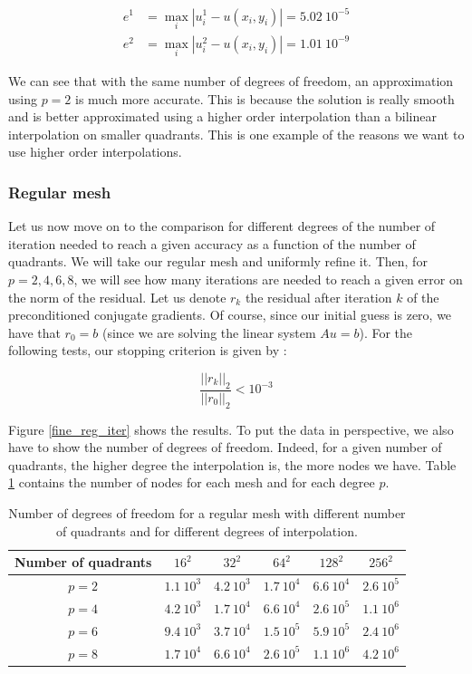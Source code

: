 \begin{align*}
e^1 &= \max_i |u^1_i - u(x_i,y_i)| = 5.02\: 10^{-5}\\
e^2 & = \max_i |u^2_i - u(x_i,y_i)| = 1.01 \: 10^{-9}
\end{align*}

We can see that with the same number of degrees of freedom, an approximation using $p=2$ is much more accurate. This is because the solution is really smooth and is better approximated using a higher order interpolation than a bilinear interpolation on smaller quadrants. This is one example of the reasons we want to use higher order interpolations. 

\subsubsection{Regular mesh}

Let us now move on to the comparison for different degrees of the number of iteration needed to reach a given accuracy as a function of the number of quadrants. We will take our regular mesh and uniformly refine it. Then, for $p=2,4,6,8$, we will see how many iterations are needed to reach a given error on the norm of the residual. Let us denote $r_k$ the residual after iteration $k$ of the preconditioned conjugate gradients. Of course, since our initial guess is zero, we have that $r_0 = b$ (since we are solving the linear system $Au = b$). For the following tests, our stopping criterion is given by :

$$ \frac{||r_k||_2}{||r_0||_2} < 10^{-3}$$

Figure \ref{fine_reg_iter} shows the results. To put the data in perspective, we also have to show the number of degrees of freedom. Indeed, for a given number of quadrants, the higher degree the interpolation is, the more nodes we have. Table \ref{fine_reg_table} contains the number of nodes for each mesh and for each degree $p$.

\begin{table}
\centering
\begin{tabular}{c|ccccc}
\hline
Number of quadrants & $16^2$ & $32^2$ & $64^2$ & $128^2$ & $256^2$\\
\hline
$p=2$ & $1.1\:10^3$ & $4.2\:10^3$ & $1.7\:10^4$ & $6.6\:10^4$ & $2.6\:10^5$\\
$p=4$ & $4.2\:10^3$ & $1.7\:10^4$ & $6.6\:10^4$ & $2.6\:10^5$ & $1.1\:10^6$\\
$p=6$ & $9.4\:10^3$ & $3.7\:10^4$ & $1.5\:10^5$ & $5.9\:10^5$ & $2.4\:10^6$\\
$p=8$ & $1.7\:10^4$ & $6.6\:10^4$ & $2.6\:10^5$ & $1.1\:10^6$ & $4.2\:10^6$\\
\hline
\end{tabular}
\caption{Number of degrees of freedom for a regular mesh with different number of quadrants and for different degrees of interpolation.}
\label{fine_reg_table}
\end{table}


